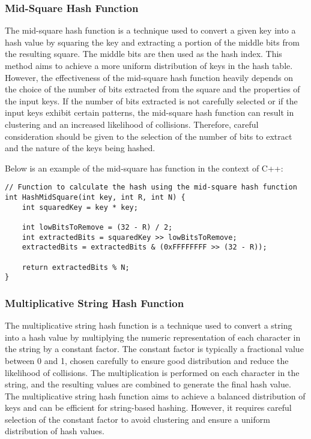 \subsubsection{Mid-Square Hash Function}

The mid-square hash function is a technique used to convert a given key into a hash value by squaring the key and extracting a portion of the middle bits from the resulting square. The middle bits are then used as 
the hash index. This method aims to achieve a more uniform distribution of keys in the hash table. However, the effectiveness of the mid-square hash function heavily depends on the choice of the number of bits 
extracted from the square and the properties of the input keys. If the number of bits extracted is not carefully selected or if the input keys exhibit certain patterns, the mid-square hash function can result in 
clustering and an increased likelihood of collisions. Therefore, careful consideration should be given to the selection of the number of bits to extract and the nature of the keys being hashed.

\begin{solution}

Below is an example of the mid-square has function in the context of C++:

\horizontalline

\begin{verbatim}
// Function to calculate the hash using the mid-square hash function
int HashMidSquare(int key, int R, int N) {
    int squaredKey = key * key;

    int lowBitsToRemove = (32 - R) / 2;
    int extractedBits = squaredKey >> lowBitsToRemove;
    extractedBits = extractedBits & (0xFFFFFFFF >> (32 - R));

    return extractedBits % N;
}
\end{verbatim}

\horizontalline
    
\end{solution}

\subsubsection{Multiplicative String Hash Function}

The multiplicative string hash function is a technique used to convert a string into a hash value by multiplying the numeric representation of each character in the string by a constant factor. The constant factor 
is typically a fractional value between 0 and 1, chosen carefully to ensure good distribution and reduce the likelihood of collisions. The multiplication is performed on each character in the string, and the resulting 
values are combined to generate the final hash value. The multiplicative string hash function aims to achieve a balanced distribution of keys and can be efficient for string-based hashing. However, it requires careful 
selection of the constant factor to avoid clustering and ensure a uniform distribution of hash values.

